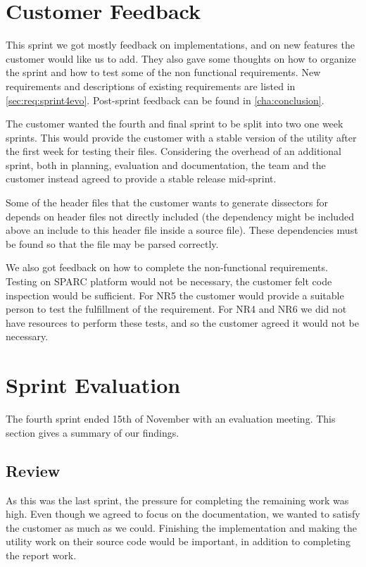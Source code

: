 \section{Customer Feedback}
\label{sec:sp4feedback}
This sprint we got mostly feedback on implementations, and on new features
the customer would like us to add. They also gave some thoughts on how to
organize the sprint and how to test some of the non functional requirements.
New requirements and descriptions of existing requirements are listed in
\autoref{sec:req:sprint4evo}. Post-sprint feedback can be found in
\autoref{cha:conclusion}.

The customer wanted the fourth and final sprint to be split into two one week
sprints. This would provide the customer with a stable version of the utility
after the first week for testing their files. Considering the overhead of an
additional sprint, both in planning, evaluation and documentation, the team
and the customer instead agreed to provide a stable release mid-sprint.

Some of the header files that the customer wants to generate dissectors for
depends on header files not directly included (the dependency might be
included above an include to this header file inside a source file). These
dependencies must be found so that the file may be parsed correctly.

We also got feedback on how to complete the non-functional requirements.
Testing on SPARC platform would not be necessary, the customer felt code
inspection would be sufficient. For NR5 the customer would provide a suitable
person to test the fulfillment of the requirement. For NR4 and NR6 we did not
have resources to perform these tests, and so the customer agreed it would
not be necessary.


\section{Sprint Evaluation}
\label{sec:sp4eval}
The fourth sprint ended 15th of November with an evaluation meeting. This section gives a summary of our findings.

\subsection{Review}
As this was the last sprint, the pressure for completing the remaining work was high. Even though we agreed to focus on the documentation, we wanted to satisfy the customer as much as we could. Finishing the implementation and making the utility work on their source code would be important, in addition to completing the report work.

